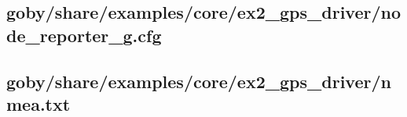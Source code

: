 \subsection{goby/share/examples/core/ex2\_gps\_driver/node\_reporter\_g.cfg} \label{sec:gps_driver:node_reporter_g.cfg}
\resetbvlinenumber

\subsection{goby/share/examples/core/ex2\_gps\_driver/nmea.txt} \label{sec:gps_driver:nmea.txt}
\resetbvlinenumber

\DeleteShortVerb{\!}
